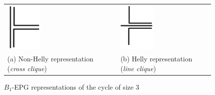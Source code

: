 \begin{figure}[h]
  \centering
  \begin{tabular}{p{3.7cm} p{1.5cm} p{3.3cm}}
     \includegraphics[width=1.8cm, center]{./img/1.png} & &\includegraphics[width=1.8cm, center]{./img/2.png}  \\%
    \footnotesize (a) Non-Helly representation (\textit{cross clique}) & & \footnotesize (b) Helly representation (\textit{line clique})%
  \end{tabular}
 \caption{$B_{1}$-EPG representations of the cycle of size 3}\label{fig:triangulos}
\end{figure}
